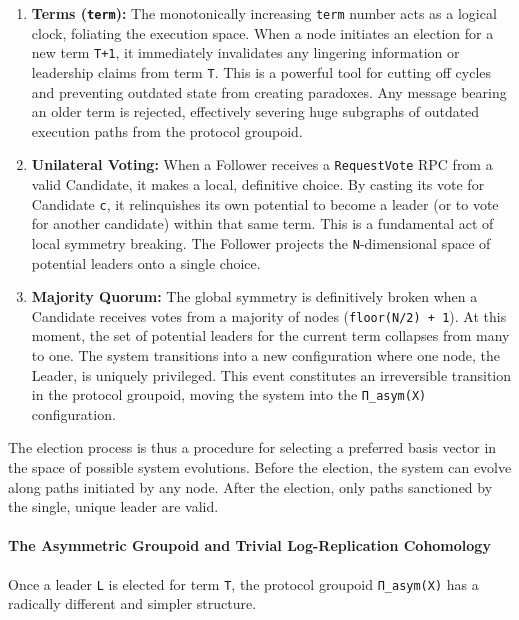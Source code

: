 \documentclass[
]{article}
\begin{document}
\begin{enumerate}
\def\labelenumi{\arabic{enumi}.}
\item
  \textbf{Terms (\texttt{term}):} The monotonically increasing
  \texttt{term} number acts as a logical clock, foliating the execution
  space. When a node initiates an election for a new term \texttt{T+1},
  it immediately invalidates any lingering information or leadership
  claims from term \texttt{T}. This is a powerful tool for cutting off
  cycles and preventing outdated state from creating paradoxes. Any
  message bearing an older term is rejected, effectively severing huge
  subgraphs of outdated execution paths from the protocol groupoid.
\item
  \textbf{Unilateral Voting:} When a Follower receives a
  \texttt{RequestVote} RPC from a valid Candidate, it makes a local,
  definitive choice. By casting its vote for Candidate \texttt{c}, it
  relinquishes its own potential to become a leader (or to vote for
  another candidate) within that same term. This is a fundamental act of
  local symmetry breaking. The Follower projects the
  \texttt{N}-dimensional space of potential leaders onto a single
  choice.
\item
  \textbf{Majority Quorum:} The global symmetry is definitively broken
  when a Candidate receives votes from a majority of nodes
  (\texttt{floor(N/2)\ +\ 1}). At this moment, the set of potential
  leaders for the current term collapses from many to one. The system
  transitions into a new configuration where one node, the Leader, is
  uniquely privileged. This event constitutes an irreversible transition
  in the protocol groupoid, moving the system into the
  \texttt{Π\_asym(X)} configuration.
\end{enumerate}

The election process is thus a procedure for selecting a preferred basis
vector in the space of possible system evolutions. Before the election,
the system can evolve along paths initiated by any node. After the
election, only paths sanctioned by the single, unique leader are valid.

\paragraph{The Asymmetric Groupoid and Trivial Log-Replication
Cohomology}\label{the-asymmetric-groupoid-and-trivial-log-replication-cohomology}

Once a leader \texttt{L} is elected for term \texttt{T}, the protocol
groupoid \texttt{Π\_asym(X)} has a radically different and simpler
structure.
\end{document}

